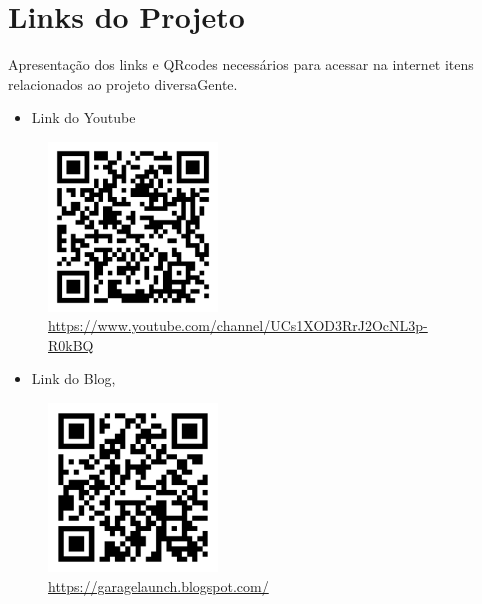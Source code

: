 \chapter{Links do Projeto}

Apresentação dos links e QRcodes necessários para acessar na internet itens relacionados ao projeto diversaGente.  


\begin{itemize}
	\item Link do Youtube
\end{itemize}
\begin{figure}[htb]
	\includegraphics[width=0.40\textwidth]{anexos/youtube.png} \\
	\hyperlink {Link Youtube}{https://www.youtube.com/channel/UCs1XOD3RrJ2OcNL3p-R0kBQ}
\end{figure}

\newline

\begin{itemize}
	\item Link do Blog,
\end{itemize}
\begin{figure}[htb]
	\includegraphics[width=0.40\textwidth]{anexos/blog.png} \\
	\hyperlink {Link do Blog}{https://garagelaunch.blogspot.com/}
\end{figure}

\pagebreak

